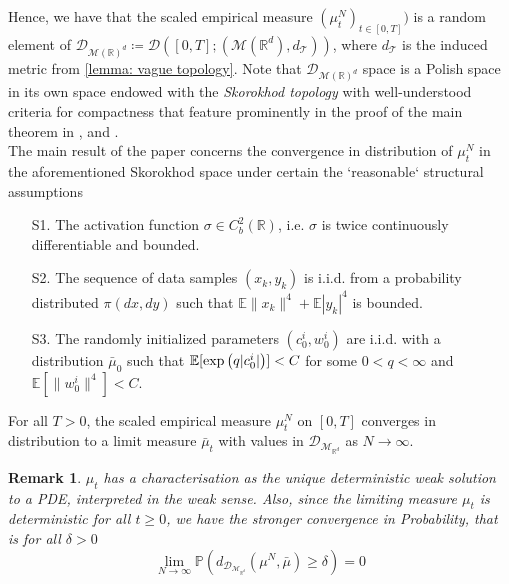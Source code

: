 \documentclass{article}
\theoremstyle{mystyle}
\newtheorem*{remark}{Remark}
\newcommand{\R}{\ensuremath{\mathbb{R}}}
\newcommand{\PP}{\ensuremath{\mathbb{P}}}
\begin{document}
Hence, we have that the scaled empirical measure $ (\mu^{N}_{t})_{t\in [0,T]})$ is a random element of $ \mathcal{D}_{ \mathcal{M}(\R)^{d}} \coloneqq \mathcal{D}([0,T]; ( \mathcal{M}(\R^{d}), d_\mathcal{T}))$, where $d_ \mathcal{T}$ is the induced metric from \ref{lemma: vague topology}. Note that $  \mathcal{D}_{ \mathcal{M}(\R)^{d}}$ space is a Polish space in its own space endowed with the \textit{Skorokhod topology} with well-understood criteria for compactness that feature prominently in the proof of the main theorem in \cite{sirignano2019meanfieldanalysislln}, and \cite{sirignano2019meanfieldanalysisclt}.\\

The main result of the paper \cite{sirignano2019meanfieldanalysislln} concerns the convergence in distribution of $ \mu^{N}_{t}$ in the aforementioned Skorokhod space under certain the `reasonable` structural assumptions

\begin{itemize}\label{assumptions spiliopoulos}
	\item[{\sf S1.}] The activation function $\sigma\in C^{2}_{b}(\mathbb{R})$, i.e. $\sigma$ is twice continuously differentiable and bounded.
\item[{\sf S2.}] The sequence of data samples $(x_k, y_k)$ is i.i.d. from a probability distributed $\pi(dx,dy)$ such that $\mathbb{E}\parallel x_{k}\parallel^{4}+\mathbb{E}|y_{k}|^{4}$ is bounded.
\item[{\sf S3.}] The randomly initialized parameters $(c_0^i, w_0^i)$ are i.i.d. with a distribution $\bar \mu_0$ such that $\mathbb{E}[ \exp \big{(} q | c_0^i | \big{)} ] < C$ for some $0 < q < \infty$ and $\mathbb{E}[ \parallel w_0^i \parallel^4 ] < C$.

\end{itemize}

\begin{theorem}\label{thm: spilopoulos lln}
	For all $ T>0$, the scaled empirical measure $ \mu^{N}_{t}$ on $ [0,T]$ converges in distribution to a
 limit measure $ \bar{\mu}_{t}$ with values in $  \mathcal{D}_{\mathcal{M}_{\R^{d}}} $ as $ N\to \infty$.
\end{theorem}

\begin{remark}
    $ \mu_{t}$ has a characterisation as the unique deterministic weak solution to a PDE, interpreted in the weak sense. Also, since the limiting measure $ \mu_{t}$ is deterministic for all $ t\geq 0$, we have the stronger convergence in Probability, that is for all $ \delta >0$
    \[
    \displaystyle \lim_{N\to \infty}\PP(d_{  \mathcal{D}_{\mathcal{M}_{\R^{d}}} }(\mu^{N}, \bar{\mu})\geq \delta) = 0 
    \]
    
\end{remark}
\end{document}
